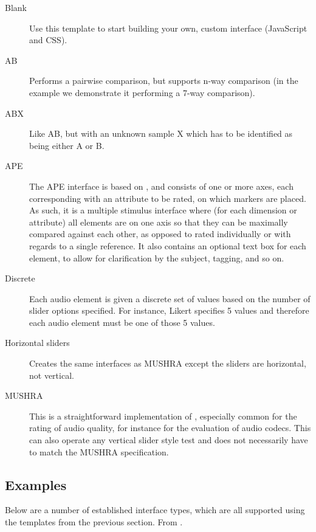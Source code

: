 \documentclass[11pt, oneside]{article}   	%
\begin{document}
		\begin{description}
			\item[Blank] Use this template to start building your own, custom interface (JavaScript and CSS). 

			\item[AB] Performs a pairwise comparison, but supports n-way comparison (in the example we demonstrate it performing a 7-way comparison).

			\item[ABX] Like AB, but with an unknown sample X which has to be identified as being either A or B. 

			\item[APE] The APE interface is based on \cite{ape}, and consists of one or more axes, each corresponding with an attribute to be rated, on which markers are placed. As such, it is a multiple stimulus interface where (for each dimension or attribute) all elements are on one axis so that they can be maximally compared against each other, as opposed to rated individually or with regards to a single reference. 
			It also contains an optional text box for each element, to allow for clarification by the subject, tagging, and so on. 

			\item[Discrete] Each audio element is given a discrete set of values based on the number of slider options specified. For instance, Likert specifies 5 values and therefore each audio element must be one of those 5 values.

			\item[Horizontal sliders] Creates the same interfaces as MUSHRA except the sliders are horizontal, not vertical.

			\item[MUSHRA] This is a straightforward implementation of \cite{mushra}, especially common for the rating of audio quality, for instance for the evaluation of audio codecs. This can also operate any vertical slider style test and does not necessarily have to match the MUSHRA specification.
		\end{description}
		    

	\subsection{Examples}
		Below are a number of established interface types, which are all supported using the templates from the previous section. %
		From \cite{waetwac}. 

		
\end{document}
